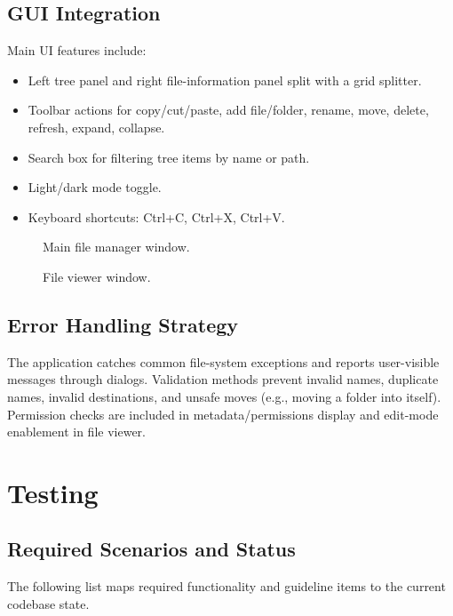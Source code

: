 \documentclass[11pt]{article}
\begin{document}
\subsection*{GUI Integration}
Main UI features include:
\begin{itemize}
  \item Left tree panel and right file-information panel split with a grid splitter.
  \item Toolbar actions for copy/cut/paste, add file/folder, rename, move, delete, refresh, expand, collapse.
  \item Search box for filtering tree items by name or path.
  \item Light/dark mode toggle.
  \item Keyboard shortcuts: Ctrl+C, Ctrl+X, Ctrl+V.
\end{itemize}

\begin{figure}[H]
\centering
{}
\caption{Main file manager window.}
\end{figure}

\begin{figure}[H]
\centering
{}
\caption{File viewer window.}
\end{figure}

\subsection*{Error Handling Strategy}
The application catches common file-system exceptions and reports user-visible messages through dialogs. Validation methods prevent invalid names, duplicate names, invalid destinations, and unsafe moves (e.g., moving a folder into itself). Permission checks are included in metadata/permissions display and edit-mode enablement in file viewer.

\section{Testing}
\subsection*{Required Scenarios and Status}
The following list maps required functionality and guideline items to the current codebase state.
\end{document}
